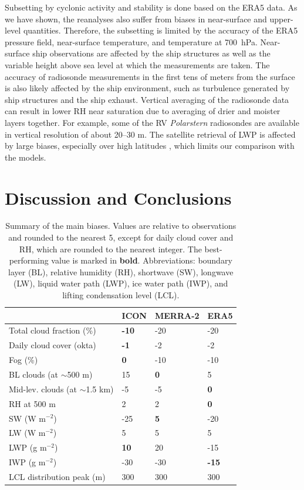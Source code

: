 \documentclass[draft]{agujournal2019}
\begin{document}
Subsetting by cyclonic activity and stability is done based on the ERA5 data. As we have shown, the reanalyses also suffer from biases in near-surface and upper-level quantities. Therefore, the subsetting is limited by the accuracy of the ERA5 pressure field, near-surface temperature, and temperature at 700~hPa. Near-surface ship observations are affected by the ship structures as well as the variable height above sea level at which the measurements are taken. The accuracy of radiosonde measurements in the first tens of meters from the surface is also likely affected by the ship environment, such as turbulence generated by ship structures and the ship exhaust. Vertical averaging of the radiosonde data can result in lower RH near saturation due to averaging of drier and moister layers together. For example, some of the RV \textit{Polarstern} radiosondes are available in vertical resolution of about 20--30 m. The satellite retrieval of LWP is affected by large biases, especially over high latitudes \cite{khanal2020}, which limits our comparison with the models.

\section{Discussion and Conclusions}

\begin{table}[t]
\caption{Summary of the main biases. Values are relative to observations and rounded to the nearest 5, except for daily cloud cover and RH, which are rounded to the nearest integer. The best-performing value is marked in \textbf{bold}. Abbreviations: boundary layer (BL), relative humidity (RH), shortwave (SW), longwave (LW), liquid water path (LWP), ice water path (IWP), and lifting condensation level (LCL).}
\label{tab:summary}
\centering
\begin{tabular}{llll}
& ICON & MERRA-2 & ERA5\\
\hline
Total cloud fraction (\%) & \textbf{-10} & -20 & -20\\
Daily cloud cover (okta) & \textbf{-1} & -2 & -2\\
Fog (\%) & \textbf{0} & -10 & -10\\
BL clouds (at $\sim$500 m) & 15 & \textbf{0} & 5\\
Mid-lev. clouds (at $\sim$1.5 km) & -5 & -5 & \textbf{0}\\
RH at 500 m & 2 & 2 & \textbf{0}\\
SW (W m$^{-2}$) & -25 & \textbf{5} & -20\\
LW (W m$^{-2}$) & 5 & 5 & 5\\
LWP (g m$^{-2}$) & \textbf{10} & 20 & -15\\
IWP (g m$^{-2}$) & -30 & -30 & \textbf{-15}\\
LCL distribution peak (m) & 300 & 300 & 300\\
\hline
\end{tabular}
\end{table}
\end{document}
